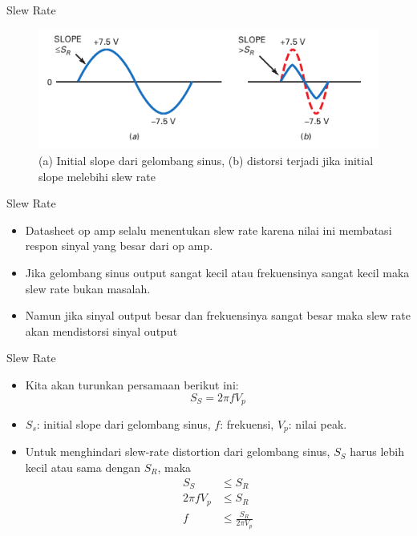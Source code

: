 \begin{frame}{Slew Rate}
	\begin{figure}
		\centering
		\includegraphics[width=0.7\linewidth]{gambar/fig-16.09}
		\caption{(a) Initial slope dari gelombang sinus, (b) distorsi terjadi jika initial slope melebihi slew rate}
		\label{fig-16.09}
	\end{figure}
\end{frame}

\begin{frame}{Slew Rate}
	\begin{itemize}
		\item Datasheet op amp selalu menentukan slew rate karena nilai ini membatasi respon sinyal yang besar dari op amp.
		\item Jika gelombang sinus output sangat kecil atau frekuensinya sangat kecil maka slew rate bukan masalah.
		\item Namun jika sinyal output besar dan frekuensinya sangat besar maka slew rate akan mendistorsi sinyal output
	\end{itemize}
\end{frame}

\begin{frame}{Slew Rate}
	\begin{itemize}
		\item Kita akan turunkan persamaan berikut ini:
		\[ S_S = 2 \pi f V_p \]
		\item $ S_s $: initial slope dari gelombang sinus, $ f $: frekuensi, $ V_p $: nilai peak.
		\item Untuk menghindari slew-rate distortion dari gelombang sinus, $ S_S $ harus lebih kecil atau sama dengan $ S_R $, maka
		\begin{align*}
			S_S &\leq S_R \\
			2 \pi f V_p &\leq S_R \\
			f &\leq \frac{S_R}{2 \pi V_p} \\
		\end{align*}
	\end{itemize}
\end{frame}

